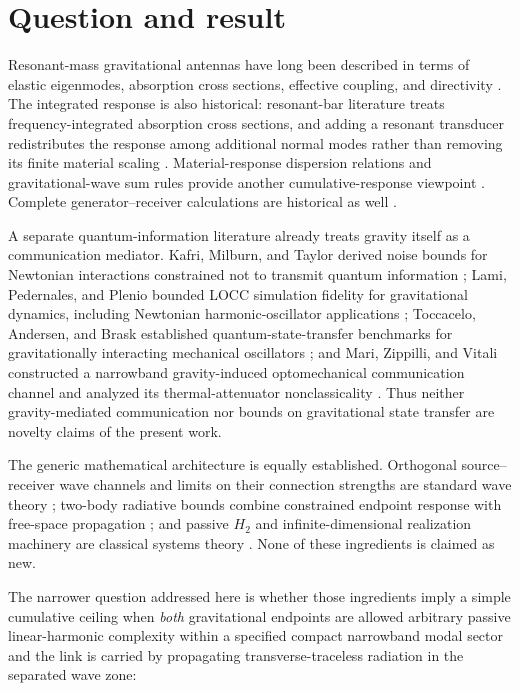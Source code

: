 \section{Question and result}
\label{sec:question}

Resonant-mass gravitational antennas have long been described in terms of elastic eigenmodes, absorption cross sections, effective coupling, and directivity \cite{Hirakawa1976,PaikWagoner1976,Lobo1995}. The integrated response is also historical: resonant-bar literature treats frequency-integrated absorption cross sections, and adding a resonant transducer redistributes the response among additional normal modes rather than removing its finite material scaling \cite{Aguiar2011}. Material-response dispersion relations and gravitational-wave sum rules provide another cumulative-response viewpoint \cite{Srivastava2003}. Complete generator--receiver calculations are historical as well \cite{Rudenko2003}.

A separate quantum-information literature already treats gravity itself as a communication mediator. Kafri, Milburn, and Taylor derived noise bounds for Newtonian interactions constrained not to transmit quantum information \cite{KafriMilburnTaylor2015}; Lami, Pedernales, and Plenio bounded LOCC simulation fidelity for gravitational dynamics, including Newtonian harmonic-oscillator applications \cite{LamiPedernalesPlenio2024}; Toccacelo, Andersen, and Brask established quantum-state-transfer benchmarks for gravitationally interacting mechanical oscillators \cite{ToccaceloAndersenBrask2025}; and Mari, Zippilli, and Vitali constructed a narrowband gravity-induced optomechanical communication channel and analyzed its thermal-attenuator nonclassicality \cite{MariZippilliVitali2026}. Thus neither gravity-mediated communication nor bounds on gravitational state transfer are novelty claims of the present work.

The generic mathematical architecture is equally established. Orthogonal source--receiver wave channels and limits on their connection strengths are standard wave theory \cite{Miller2000}; two-body radiative bounds combine constrained endpoint response with free-space propagation \cite{Molesky2020}; and passive $H_2$ and infinite-dimensional realization machinery are classical systems theory \cite{BarasBrockett1975,Opmeer2013}. None of these ingredients is claimed as new.

The narrower question addressed here is whether those ingredients imply a simple cumulative ceiling when \emph{both} gravitational endpoints are allowed arbitrary passive linear-harmonic complexity within a specified compact narrowband modal sector and the link is carried by propagating transverse-traceless radiation in the separated wave zone:

